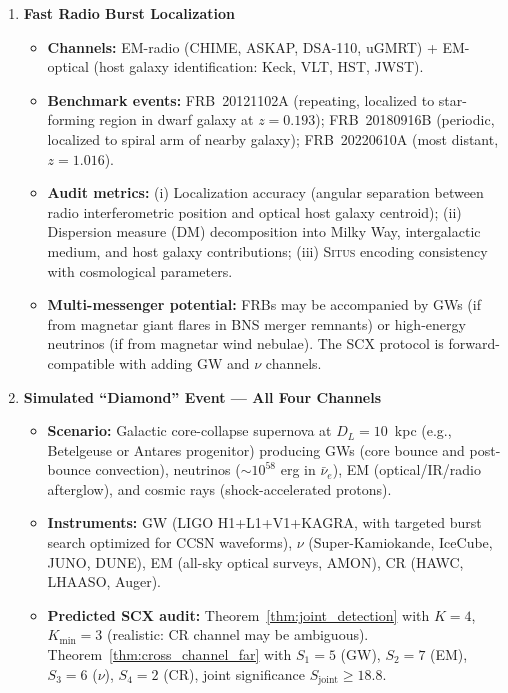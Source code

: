\documentclass[11pt,a4paper]{article}
\theoremstyle{definition}
\newcommand{\Situs}{\textsc{Situs}}
\newcommand{\SCX}{\textsc{SCX}}
\begin{document}
\begin{enumerate}[label=\textbf{BM\arabic*:}, leftmargin=*]
\begin{itemize}
        \item \textbf{Systematic evaluation:} Vary IceCube ice model parameters to assess systematic shift in reconstructed neutrino direction; apply Theorem~\ref{thm:unidentifiability} to determine whether apparent $\nu$-EM associations could be artifacts of ice model miscalibration.
    \end{itemize}
    \item \textbf{Fast Radio Burst Localization}
    \begin{itemize}
        \item \textbf{Channels:} EM-radio (CHIME, ASKAP, DSA-110, uGMRT) + EM-optical (host galaxy identification: Keck, VLT, HST, JWST).
        \item \textbf{Benchmark events:} FRB~20121102A (repeating, localized to star-forming region in dwarf galaxy at $z=0.193$); FRB~20180916B (periodic, localized to spiral arm of nearby galaxy); FRB~20220610A (most distant, $z=1.016$).
        \item \textbf{Audit metrics:} (i) Localization accuracy (angular separation between radio interferometric position and optical host galaxy centroid); (ii) Dispersion measure (DM) decomposition into Milky Way, intergalactic medium, and host galaxy contributions; (iii) \Situs{} encoding consistency with cosmological parameters.
        \item \textbf{Multi-messenger potential:} FRBs may be accompanied by GWs (if from magnetar giant flares in BNS merger remnants) or high-energy neutrinos (if from magnetar wind nebulae). The \SCX{} protocol is forward-compatible with adding GW and $\nu$ channels.
    \end{itemize}
    \item \textbf{Simulated ``Diamond'' Event --- All Four Channels}
    \begin{itemize}
        \item \textbf{Scenario:} Galactic core-collapse supernova at $D_L = 10$~kpc (e.g., Betelgeuse or Antares progenitor) producing GWs (core bounce and post-bounce convection), neutrinos ($\sim 10^{58}$ erg in $\bar{\nu}_e$), EM (optical/IR/radio afterglow), and cosmic rays (shock-accelerated protons).
        \item \textbf{Instruments:} GW (LIGO H1+L1+V1+KAGRA, with targeted burst search optimized for CCSN waveforms), $\nu$ (Super-Kamiokande, IceCube, JUNO, DUNE), EM (all-sky optical surveys, AMON), CR (HAWC, LHAASO, Auger).
        \item \textbf{Predicted \SCX{} audit:} Theorem~\ref{thm:joint_detection} with $K=4$, $K_{\mathrm{min}}=3$ (realistic: CR channel may be ambiguous). Theorem~\ref{thm:cross_channel_far} with $S_1 = 5$ (GW), $S_2 = 7$ (EM), $S_3 = 6$ ($\nu$), $S_4 = 2$ (CR), joint significance $S_{\mathrm{joint}} \geq 18.8$.
    \end{itemize}
\end{enumerate}
\end{document}

